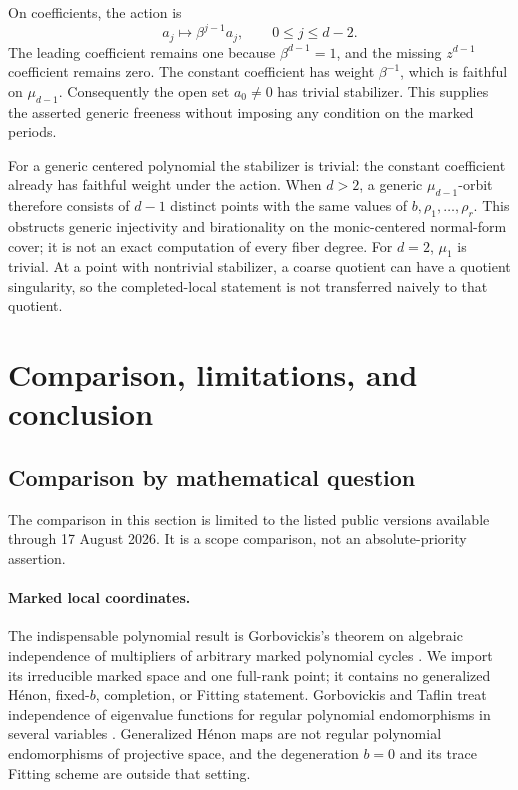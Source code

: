 \documentclass[11pt]{article}
\theoremstyle{definition}
\theoremstyle{remark}
\begin{document}
On coefficients, the action is
\[
  a_j\longmapsto \beta^{j-1}a_j,
  \qquad 0\leq j\leq d-2.
\]
The leading coefficient remains one because $\beta^{d-1}=1$, and the
missing $z^{d-1}$ coefficient remains zero.  The constant coefficient has
weight $\beta^{-1}$, which is faithful on $\mu_{d-1}$.  Consequently the
open set $a_0\neq0$ has trivial stabilizer.  This supplies the asserted
generic freeness without imposing any condition on the marked periods.

For a generic centered polynomial the stabilizer is trivial: the constant
coefficient already has faithful weight under the action.  When $d>2$, a
generic $\mu_{d-1}$-orbit therefore consists of $d-1$ distinct points with
the same values of $b,\rho_1,\ldots,\rho_r$.  This obstructs generic
injectivity and birationality on the monic-centered normal-form cover; it is
not an exact computation of every fiber degree.  For $d=2$, $\mu_1$ is
trivial.  At a point with nontrivial stabilizer, a coarse quotient can have
a quotient singularity, so the completed-local statement is not transferred
naively to that quotient.

\section{Comparison, limitations, and conclusion}
\label{sec:comparison}

\subsection{Comparison by mathematical question}

The comparison in this section is limited to the listed public versions
available through 17 August 2026.  It is a scope comparison, not an
absolute-priority assertion.

\paragraph{Marked local coordinates.}
The indispensable polynomial result is Gorbovickis's theorem on algebraic
independence of multipliers of arbitrary marked polynomial cycles
\cite{Gor13}.  We import its irreducible marked space and one full-rank
point; it contains no generalized Hénon, fixed-$b$, completion, or Fitting
statement.  Gorbovickis and Taflin treat independence of eigenvalue
functions for regular polynomial endomorphisms in several variables
\cite{GT24}.  Generalized Hénon maps are not regular polynomial
endomorphisms of projective space, and the degeneration $b=0$ and its trace
Fitting scheme are outside that setting.
\end{document}

